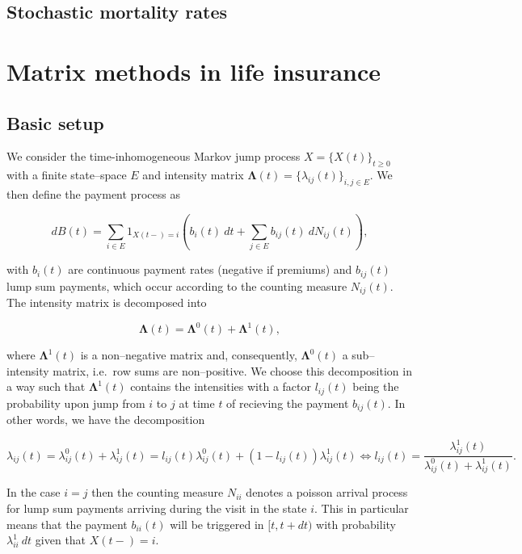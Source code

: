 \documentclass[
]{book}
\begin{document}
\hypertarget{stochastic-mortality-rates}{%
\subsection{Stochastic mortality rates}\label{stochastic-mortality-rates}}

\hypertarget{matrix-methods-in-life-insurance}{%
\section{Matrix methods in life insurance}\label{matrix-methods-in-life-insurance}}

\hypertarget{basic-setup}{%
\subsection{Basic setup}\label{basic-setup}}

We consider the time-inhomogeneous Markov jump process \(X=\{X(t)\}_{t\ge 0}\) with a finite state--space \(E\) and intensity matrix \(\mathbf \Lambda(t)=\{\lambda_{ij}(t)\}_{i,j\in E}\). We then define the payment process as

\[
dB(t)=\sum_{i\in E}1_{X(t-)=i}\left(b_i(t)\ dt +\sum_{j\in E}b_{ij}(t)\ dN_{ij}(t)\right),
\]

with \(b_i(t)\) are continuous payment rates (negative if premiums) and \(b_{ij}(t)\) lump sum payments, which occur according to the counting measure \(N_{ij}(t)\). The intensity matrix is decomposed into

\[
\mathbf \Lambda(t)=\mathbf \Lambda^0(t) + \mathbf \Lambda^1(t),
\]

where \(\mathbf \Lambda^1(t)\) is a non--negative matrix and, consequently, \(\mathbf \Lambda^0(t)\) a sub--intensity matrix, i.e.~row sums are non--positive. We choose this decomposition in a way such that \(\mathbf \Lambda^1(t)\) contains the intensities with a factor \(l_{ij}(t)\) being the probability upon jump from \(i\) to \(j\) at time \(t\) of recieving the payment \(b_{ij}(t)\). In other words, we have the decomposition

\[
\lambda_{ij}(t)=\lambda_{ij}^0(t)+\lambda_{ij}^1(t)=l_{ij}(t)\lambda_{ij}^0(t)+(1-l_{ij}(t))\lambda_{ij}^1(t)\iff l_{ij}(t)=\frac{\lambda_{ij}^1(t)}{\lambda_{ij}^0(t)+\lambda_{ij}^1(t)}.
\]

In the case \(i=j\) then the counting measure \(N_{ii}\) denotes a poisson arrival process for lump sum payments arriving during the visit in the state \(i\). This in particular means that the payment \(b_{ii}(t)\) will be triggered in \([t,t+dt)\) with probability \(\lambda_{ii}^1\ dt\) given that \(X(t-)=i\).
\end{document}
